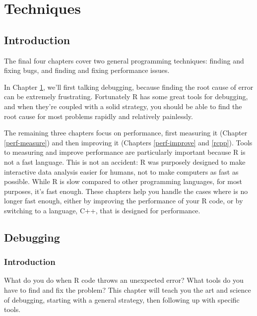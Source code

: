 \documentclass[]{book}
\begin{document}
\hypertarget{part-techniques}{%
\part{Techniques}\label{part-techniques}}

\hypertarget{introduction-6}{%
\chapter*{Introduction}\label{introduction-6}}

The final four chapters cover two general programming techniques: finding and fixing bugs, and finding and fixing performance issues.

In Chapter \ref{debugging}, we'll first talking debugging, because finding the root cause of error can be extremely frustrating. Fortunately R has some great tools for debugging, and when they're coupled with a solid strategy, you should be able to find the root cause for most problems rapidly and relatively painlessly.

The remaining three chapters focus on performance, first measuring it (Chapter \ref{perf-measure}) and then improving it (Chapters \ref{perf-improve} and \ref{rcpp}). Tools to measuring and improve performance are particularly important because R is not a fast language. This is not an accident: R was purposely designed to make interactive data analysis easier for humans, not to make computers as fast as possible. While R is slow compared to other programming languages, for most purposes, it's fast enough. These chapters help you handle the cases where is no longer fast enough, either by improving the performance of your R code, or by switching to a language, C++, that is designed for performance.

\hypertarget{debugging}{%
\chapter{Debugging}\label{debugging}}

\hypertarget{introduction-7}{%
\section{Introduction}\label{introduction-7}}


What do you do when R code throws an unexpected error? What tools do you have to find and fix the problem? This chapter will teach you the art and science of debugging, starting with a general strategy, then following up with specific tools.
\end{document}
